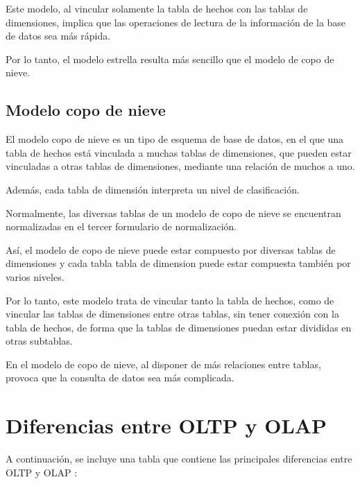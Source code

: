 Este modelo, al vincular solamente la tabla de hechos con las tablas de dimensiones,  implica que las operaciones de lectura de la información de la base de datos sea más rápida.

Por lo tanto, el modelo estrella resulta más sencillo que el modelo de copo de nieve.

\subsection{Modelo copo de nieve}
El modelo copo de nieve \cite{Copo_nieve} es un tipo de esquema de base de datos, en el que una tabla de hechos está vinculada a muchas tablas de dimensiones, que pueden estar vinculadas a otras tablas de dimensiones, mediante una relación de muchos a uno.

Además, cada tabla de dimensión interpreta un nivel de clasificación.

Normalmente, las diversas tablas de un modelo de copo de nieve se encuentran normalizadas en el tercer formulario de normalización.

Así, el modelo de copo de nieve puede estar compuesto por diversas tablas de dimensiones y cada tabla tabla de dimension puede estar compuesta también por varios niveles.


Por lo tanto, este modelo trata de vincular tanto la tabla de hechos, como de vincular las tablas de dimensiones entre otras tablas, sin tener conexión con la tabla de hechos, de forma que la tablas de dimensiones puedan estar divididas en otras subtablas.

En el modelo de copo de nieve, al disponer de más relaciones entre tablas, provoca que la consulta de datos sea más complicada.
\newpage
\section{Diferencias entre OLTP y OLAP}

A continuación, se incluye una tabla que contiene las principales diferencias entre OLTP y OLAP \cite{Diferencias_OLTP_OLAP} :

